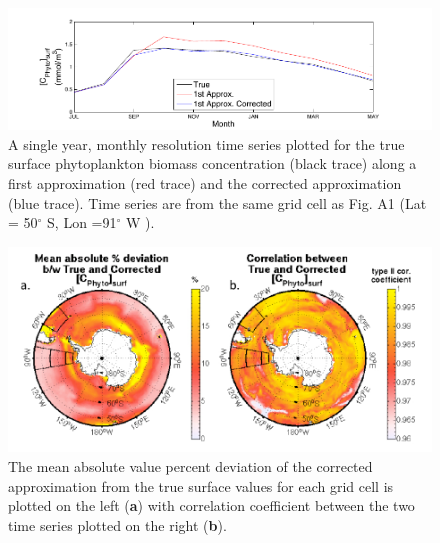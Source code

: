 

\begin{figure}[!htbp]
\begin{adjustwidth}{-1in}{-1in}
 \centering
 \includegraphics[scale=1.3]{figures/A1/Figure2.pdf}
\end{adjustwidth}
\caption[Time Series of {$[C_{phyto}]_{surf}$}]{A single year, monthly resolution time series plotted for the true surface phytoplankton biomass
concentration (black trace) along a first approximation (red trace) and the corrected approximation (blue trace). Time series are from the same grid cell as Fig. A1 (Lat = 50$^\circ$ S, Lon =91$^\circ$ W ).  }
\label{fig:Fig2}
\end{figure}




\begin{figure}[!htbp]
\begin{adjustwidth}{-1in}{-1in}
 \centering
 \includegraphics[scale=1.2]{figures/A1/Figure3.pdf}
\end{adjustwidth}
\caption[Model Skill]{The mean absolute value percent deviation of the corrected approximation from the true surface
values for each grid cell is plotted on the left (\textbf{a}) with correlation coefficient between the two time series plotted on the right (\textbf{b}). }
\label{fig:Fig3}
\end{figure}


